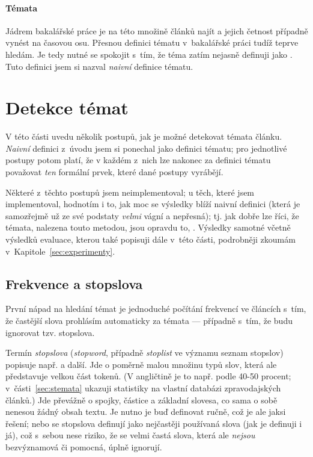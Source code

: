 \documentclass[12pt,a4paper]{report}
\begin{document}
\subsubsection{Témata}
\label{sec:sub_temata}
Jádrem bakalářské práce je na této množině článků najít  a jejich četnost případně vynést na časovou osu. Přesnou definici tématu v~bakalářské práci tudíž teprve hledám. Je tedy nutné se spokojit s~tím, že téma zatím nejasně definuji jako . Tuto definici jsem si nazval \emph{naivní} definice tématu.


\chapter{Detekce témat}
\label{sec:hledanitemat_hlavni}
V této části uvedu několik postupů, jak je možné detekovat témata článku. \emph{Naivní} definici z~úvodu jsem si ponechal jako  definici tématu; pro jednotlivé postupy potom platí, že v každém z~nich lze nakonec za definici tématu považovat \emph{ten} formální prvek, které dané postupy vyrábějí. 

Některé z~těchto postupů jsem neimplementoval; u těch, které jsem implementoval, hodnotím i to, jak moc se výsledky blíží naivní definici (která je samozřejmě už ze své podstaty \emph{velmi} vágní a nepřesná); tj. jak dobře lze říci, že témata, nalezena touto metodou, jsou opravdu to, . Výsledky samotné včetně výsledků evaluace, kterou také popisuji dále v~této části, podrobněji zkoumám v~Kapitole~\ref{sec:experimenty}.

\section{Frekvence a stopslova}
\label{sec:frekvestopslo}

První nápad na hledání témat je jednoduché počítání frekvencí ve článcích s~tím, že častější slova prohlásím automaticky za témata --- případně s~tím, že budu ignorovat tzv. stopslova.

Termín \emph{stopslova} (\emph{stopword}, případně \emph{stoplist} ve významu seznam stopslov) popisuje např. \cite{introduction} a další. Jde o po\-mě\-r\-ně ma\-lou mno\-ži\-nu ty\-pů slov, kte\-rá ale před\-sta\-vu\-je vel\-kou část to\-ke\-nů. (V angličtině je to např. po\-dle \cite{introduction} 40-50 pro\-cent; v~části~\ref{sec:stemata} ukazuji statistiky na vlastní databázi zpravodajských článků.) Jde převážně o spojky, částice a zá\-klad\-ní slovesa, co sama o sobě nenesou žádný obsah textu. Je nutno je buď definovat ručně, což je ale jaksi  řešení; nebo se stopslova definují jako nej\-čas\-tě\-ji po\-u\-ží\-va\-ná slo\-va (jak je definuji i já), což s~sebou ne\-se ri\-zi\-ko, že se vel\-mi čas\-tá slo\-va, kte\-rá ale \emph{ne\-jsou} bez\-vý\-zna\-mo\-vá či po\-moc\-ná, ú\-pl\-ně i\-gno\-ru\-jí.
\end{document}
